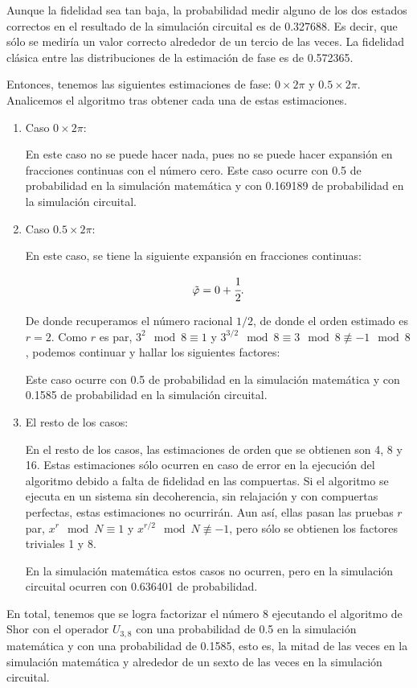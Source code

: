 Aunque la fidelidad sea tan baja, la probabilidad medir alguno de los dos estados correctos en el resultado de la simulación circuital es de 0.327688. Es decir, que sólo se mediría un valor correcto alrededor de un tercio de las veces. La fidelidad clásica entre las distribuciones de la estimación de fase es de 0.572365.

Entonces, tenemos las siguientes estimaciones de fase: $0 \times 2\pi$ y $0.5 \times 2\pi$. Analicemos el algoritmo tras obtener cada una de estas estimaciones.

\begin{enumerate}
    \item Caso $0 \times 2\pi$:

        En este caso no se puede hacer nada, pues no se puede hacer expansión en fracciones continuas con el número cero. Este caso ocurre con 0.5 de probabilidad en la simulación matemática y con 0.169189 de probabilidad en la simulación circuital.

    \item Caso $0.5 \times 2\pi$:

        En este caso, se tiene la siguiente expansión en fracciones continuas:

        \begin{equation}
            \tilde{\varphi} = 0 + \cfrac{1}{2} .
        \end{equation}
        
        De donde recuperamos el número racional $1/2$, de donde el orden estimado es $r = 2$. Como $r$ es par, $3^{2}\mod 8 \equiv 1$ y $3^{3/2}\mod 8 \equiv 3\mod 8 \not\equiv -1\mod 8$, podemos continuar y hallar los siguientes factores:

        Este caso ocurre con 0.5 de probabilidad en la simulación matemática y con 0.1585 de probabilidad en la simulación circuital.

    \item El resto de los casos:

        En el resto de los casos, las estimaciones de orden que se obtienen son 4, 8 y 16. Estas estimaciones sólo ocurren en caso de error en la ejecución del algoritmo debido a falta de fidelidad en las compuertas. Si el algoritmo se ejecuta en un sistema sin decoherencia, sin relajación y con compuertas perfectas, estas estimaciones no ocurrirán. Aun así, ellas pasan las pruebas $r$ par, $x^r \mod N \equiv 1$ y $x^{r/2} \mod N \not\equiv -1$, pero sólo se obtienen los factores triviales 1 y 8.

        En la simulación matemática estos casos no ocurren, pero en la simulación circuital ocurren con 0.636401 de probabilidad.
\end{enumerate}

En total, tenemos que se logra factorizar el número 8 ejecutando el algoritmo de Shor con el operador $U_{3,8}$ con una probabilidad de 0.5 en la simulación matemática y con una probabilidad de 0.1585, esto es, la mitad de las veces en la simulación matemática y alrededor de un sexto de las veces en la simulación circuital.

